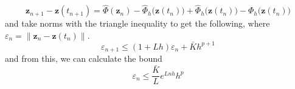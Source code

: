     \begin{equation}
      \mathbf{z}_{n+1} - \mathbf{z}(t_{n+1}) = \hat{\Phi}(\mathbf{z}_n) - \hat{\Phi}_h \big(\mathbf{z}(t_n)\big) + \hat{\Phi}_h \big(\mathbf{z}(t_n)\big) - \Phi_h \big(\mathbf{z}(t_n) \big)
    \end{equation}
    and take norms with the triangle inequality to get the following, where $\varepsilon_n = \|\mathbf{z}_n - \mathbf{z}(t_n)\|$. 
    \begin{equation}
      \varepsilon_{n+1} \leq (1 + L h) \varepsilon_n + \bar{K} h^{p+1}
    \end{equation}
    and from this, we can calculate the bound 
    \begin{equation}
      \varepsilon_n \leq \frac{\bar{K}}{L} e^{L n h} h^p
    \end{equation}

